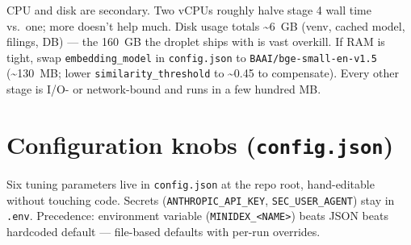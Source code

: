 \documentclass[11pt,a4paper,oneside]{article}
\begin{document}
CPU and disk are secondary. Two vCPUs roughly halve stage 4 wall time vs.\ one; more doesn't help much. Disk usage totals \textasciitilde 6~GB (venv, cached model, filings, DB) --- the 160~GB the droplet ships with is vast overkill. If RAM is tight, swap \texttt{embedding\_model} in \texttt{config.json} to \texttt{BAAI/bge-small-en-v1.5} (\textasciitilde 130~MB; lower \texttt{similarity\_threshold} to \textasciitilde 0.45 to compensate). Every other stage is I/O- or network-bound and runs in a few hundred MB.

\section{Configuration knobs (\texttt{config.json})}

Six tuning parameters live in \texttt{config.json} at the repo root, hand-editable without touching code. Secrets (\texttt{ANTHROPIC\_API\_KEY}, \texttt{SEC\_USER\_AGENT}) stay in \texttt{.env}. Precedence: environment variable (\texttt{MINIDEX\_<NAME>}) beats JSON beats hardcoded default --- file-based defaults with per-run overrides.
\end{document}
